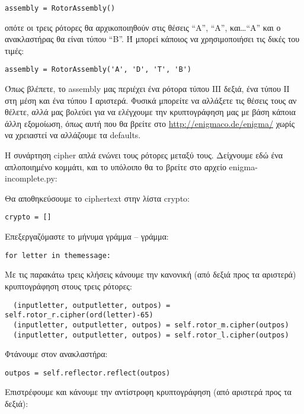 \documentclass[a4paper,twoside,12pt]{article}
\begin{document}
\begin{verbatim}
assembly = RotorAssembly()
\end{verbatim}

οπότε οι τρεις ρότορες θα αρχικοποιηθούν στις θέσεις “Α”, “Α”, και\ldots “Α” και ο ανακλαστήρας θα είναι τύπου “B”. Ή μπορεί κάποιος να χρησιμοποιήσει τις δικές του τιμές:

\begin{verbatim}
assembly = RotorAssembly('A', 'D', 'T', 'B')
\end{verbatim}

Όπως βλέπετε, το assembly μας περιέχει ένα ρότορα τύπου ΙΙΙ δεξιά, ένα τύπου ΙΙ στη μέση και ένα τύπου Ι αριστερά.  Φυσικά μπορείτε να αλλάξετε τις θέσεις τους αν θέλετε, αλλά μας βολεύει για να ελέγχουμε την κρυπτογράφηση μας με βάση κάποια άλλη εξομοίωση, όπως αυτή που θα βρείτε στο \url{http://enigmaco.de/enigma/} χωρίς να χρειαστεί να αλλάζουμε τα defaults.

Η συνάρτηση cipher απλά ενώνει τους ρότορες μεταξύ τους. Δείχνουμε εδώ ένα απλοποιημένο κομμάτι, και το υπόλοιπο θα το βρείτε στο αρχείο enigma-incomplete.py:

Θα αποθηκεύσουμε το ciphertext στην λίστα crypto:

\begin{verbatim}
crypto = []
\end{verbatim}

Επεξεργαζόμαστε το μήνυμα γράμμα – γράμμα:

\begin{verbatim}
for letter in themessage:
\end{verbatim}

Με τις παρακάτω τρεις κλήσεις κάνουμε την κανονική (από δεξιά προς τα αριστερά) κρυπτογράφηση στους τρεις ρότορες:

\begin{verbatim}
  (inputletter, outputletter, outpos) = self.rotor_r.cipher(ord(letter)-65)
  (inputletter, outputletter, outpos) = self.rotor_m.cipher(outpos)
  (inputletter, outputletter, outpos) = self.rotor_l.cipher(outpos)
\end{verbatim}

Φτάνουμε στον ανακλαστήρα:

\begin{verbatim}
outpos = self.reflector.reflect(outpos)
\end{verbatim}

Επιστρέφουμε και κάνουμε την αντίστροφη κρυπτογράφηση (από αριστερά προς τα δεξιά):
\end{document}
